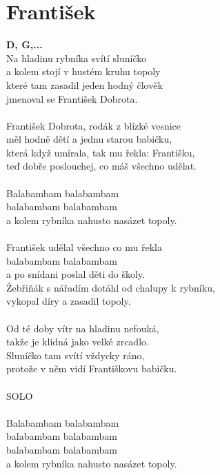 \section{František}
\footnotesize\textbf{D, G,...}\\
\normalsize
{}Na hladinu rybníka svítí sluníčko\\
a kolem stojí v hustém kruhu topoly\\
které tam zasadil jeden hodný člověk\\
jmenoval se František Dobrota.\\
\\
František Dobrota, rodák z blízké vesnice\\
měl hodně dětí a jednu starou babičku,\\
která když umírala, tak mu řekla: Františku,\\
teď dobře poslouchej, co máš všechno udělat.\\
\\
Balabambam balabambam\\
balabambam balabambam\\
a kolem rybníka nahusto nasázet topoly.\\
\\
František udělal všechno co mu řekla\\
balabambam balabambam\\
a po snídani poslal děti do školy.\\
Žebřiňák s nářadím dotáhl od chalupy k rybníku,\\
vykopal díry a zasadil topoly.\\
\\
Od té doby vítr na hladinu nefouká,\\
takže je klidná jako velké zrcadlo.\\
Sluníčko tam svítí vždycky ráno,\\
protože v něm vidí Františkovu babičku.\\
\\
SOLO\\
\\
Balabambam balabambam\\
balabambam balabambam\\
balabambam balabambam\\
a kolem rybníka nahusto nasázet topoly.\\
